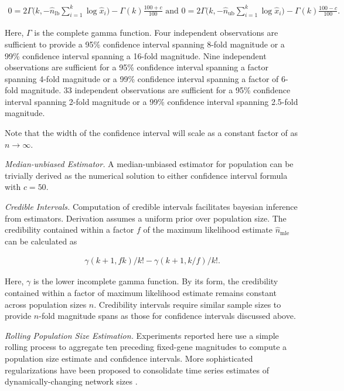 \begin{footnotesize}
\begin{align}
0
= 2\Gamma\Big(k, -\hat{n}_\mathrm{lb}\sum_{i=1}^k \log\hat{x}_i\Big) - \Gamma(k)\frac{100+c}{100} \text{ and }
0
= 2\Gamma\Big(k, -\hat{n}_\mathrm{ub}\sum_{i=1}^k \log\hat{x}_i\Big) - \Gamma(k)\frac{100-c}{100}.  \label{eqn:popsize_mle_ci}
\end{align}
\end{footnotesize}

Here, $\Gamma$ is the complete gamma function.
Four independent observations are sufficient to provide a 95\% confidence interval spanning 8-fold magnitude or a 99\% confidence interval spanning a 16-fold magnitude.
Nine independent observations are sufficient for a 95\% confidence interval spanning a factor spanning 4-fold magnitude or a 99\% confidence interval spanning a factor of 6-fold magnitude.
33 independent observations are sufficient for a 95\% confidence interval spanning 2-fold magnitude or a 99\% confidence interval spanning 2.5-fold magnitude.

Note that the width of the confidence interval will scale as a constant factor of as $n \to \infty$.

\textit{Median-unbiased Estimator.}
A median-unbiased estimator for population can be trivially derived as the numerical solution to either confidence interval formula with $c = 50$.

\textit{Credible Intervals.}
Computation of credible intervals facilitates bayesian inference from estimators.
Derivation assumes a uniform prior over population size.
The credibility contained within a factor $f$ of the maximum likelihood estimate $\hat{n}_\mathrm{mle}$ can be calculated as

\begin{footnotesize}
\begin{align*}
\gamma(k + 1, f k)/k! - \gamma(k + 1, k/f)/k!.
\end{align*}
\end{footnotesize}

Here, $\gamma$ is the lower incomplete gamma function.
By its form, the credibility contained within a factor of maximum likelihood estimate remains constant across population sizes $n$.
Credibility intervals require similar sample sizes to provide $n$-fold magnitude spans as those for confidence intervals discussed above.

\textit{Rolling Population Size Estimation.}
Experiments reported here use a simple rolling process to aggregate ten preceding fixed-gene magnitudes to compute a population size estimate and confidence intervals.
More sophisticated regularizations have been proposed to consolidate time series estimates of dynamically-changing network sizes \citep{hakan2012distributed}.

